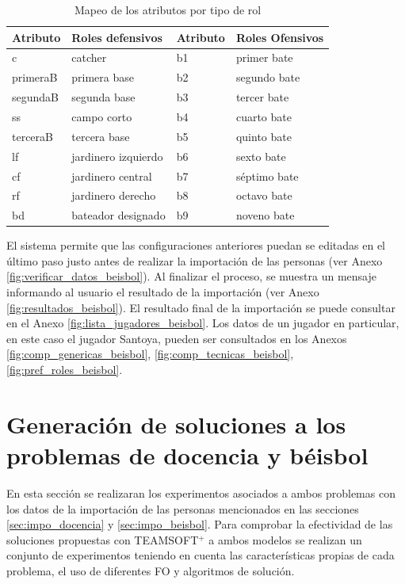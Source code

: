 \begin{table}[H]
	\centering
	\caption{Mapeo de los atributos por tipo de rol}\label{mapeo-tipo-roles}
		\begin{tabular}{l l l l}
			\toprule
			\textbf{Atributo} & \textbf{Roles defensivos} & \textbf{Atributo} & \textbf{Roles Ofensivos} \\ \midrule
			c                 & catcher                   & b1                & primer bate              \\
			primeraB          & primera base              & b2                & segundo bate             \\
			segundaB          & segunda base              & b3                & tercer bate              \\
			ss                & campo corto               & b4                & cuarto bate              \\
			terceraB          & tercera base              & b5                & quinto bate              \\
			lf                & jardinero izquierdo       & b6                & sexto bate               \\
			cf                & jardinero central         & b7                & séptimo bate             \\
			rf                & jardinero derecho         & b8                & octavo bate              \\
			bd                & bateador designado        & b9                & noveno bate              \\ \bottomrule
		\end{tabular}
\end{table}


El sistema permite que las configuraciones anteriores puedan se editadas en el último paso justo antes de realizar la importación de las personas (ver Anexo \ref{fig:verificar_datos_beisbol}). Al finalizar el proceso, se muestra un mensaje informando al usuario el resultado de la importación (ver Anexo \ref{fig:resultados_beisbol}). El resultado final de la importación se puede consultar en el Anexo \ref{fig:lista_jugadores_beisbol}. Los datos de un jugador en particular, en este caso el jugador Santoya, pueden ser consultados en los Anexos \ref{fig:comp_genericas_beisbol}, \ref{fig:comp_tecnicas_beisbol}, \ref{fig:pref_roles_beisbol}.


\section{Generación de soluciones a los problemas de docencia y béisbol}
En esta sección se realizaran los experimentos asociados a ambos problemas con los datos de la importación de las personas mencionados en las secciones \ref{sec:impo_docencia} y \ref{sec:impo_beisbol}. Para comprobar la efectividad de las soluciones propuestas con TEAMSOFT$^+$ a ambos modelos se realizan un conjunto de experimentos teniendo en cuenta las características propias de cada problema, el uso de diferentes FO y algoritmos de solución.

